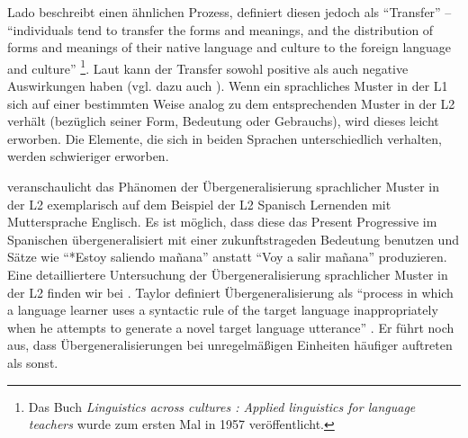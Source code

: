 Lado beschreibt einen ähnlichen Prozess, definiert diesen jedoch als ``Transfer'' --
``individuals tend to transfer the forms and meanings, and the distribution of forms and meanings of their native language and culture to the foreign language and culture'' \cite{Lado71}
\footnote{Das Buch \textit{Linguistics across cultures : Applied linguistics
for language teachers} wurde zum ersten Mal in 1957 veröffentlicht.}.
Laut \cite{Lado71} kann der Transfer sowohl positive als auch negative Auswirkungen haben (vgl. dazu auch \cite{Ellis08}).
Wenn ein sprachliches Muster in der L1 sich auf einer bestimmten Weise analog zu dem entsprechenden Muster in der L2 verhält (bezüglich seiner Form, Bedeutung oder Gebrauchs), wird dieses leicht erworben.
Die Elemente, die sich in beiden Sprachen unterschiedlich verhalten, werden schwieriger erworben.

\cite{Braidi99} veranschaulicht das Phänomen der Übergeneralisierung sprachlicher Muster in der L2 exemplarisch auf dem Beispiel der L2 Spanisch Lernenden mit Muttersprache Englisch.
Es ist möglich, dass diese das Present Progressive im Spanischen übergeneralisiert mit einer zukunftstrageden Bedeutung benutzen und Sätze wie ``*Estoy saliendo mañana'' anstatt ``Voy a salir mañana'' produzieren.
Eine detailliertere Untersuchung der Übergeneralisierung sprachlicher Muster in der L2
finden wir bei \cite{Taylor75}.
Taylor definiert Übergeneralisierung als ``process in which a language learner uses a syntactic rule of the
target language inappropriately when he attempts to generate a novel target language utterance'' \cite{Taylor75}.
Er führt noch aus, dass Übergeneralisierungen bei unregelmäßigen Einheiten häufiger auftreten als sonst.




